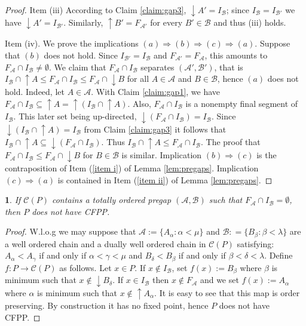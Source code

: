 \documentclass[12pt]{amsart}
\newtheorem{lemma}[definition]{\noindent {\bf Lemma}}
\begin{document}
\begin{proof}
Item (iii) According to Claim \ref{claim:gap3}, ${\downarrow \!\!}
A'=I_{\mathcal B}$; since $I_{\mathcal B}=I_{\mathcal B'}$ we have
${\downarrow \!\!} A'=I_{\mathcal B'}$. Similarly, ${\uparrow \!\!}
B'=F_{\mathcal A'}$ for every $B'\in \mathcal B$ and thus (iii) holds.

Item (iv). We prove the implications $(a) \Rightarrow (b)\Rightarrow
(c) \Rightarrow (a)$. Suppose that $(b)$ does not hold. Since
$I_{\mathcal B'}=I_{\mathcal B}$ and $F_{\mathcal A'}=F_{\mathcal A}$,
this amounts to $F_{\mathcal A}\cap I_{\mathcal B}\not =\emptyset$. We
claim that $F_{\mathcal A}\cap I_{\mathcal B}$ separates $(\mathcal
A', \mathcal B')$, that is $I_{\mathcal B}\cap {\uparrow \!\!} A\leq
F_{\mathcal A}\cap I_{\mathcal B}\leq F_{\mathcal A}\cap
{\downarrow \!\!} B$ for all $A\in \mathcal A$ and $B\in\mathcal B$,
hence $(a)$ does not hold. Indeed, let $A\in \mathcal A$.  With Claim
\ref {claim:gap1}, we have $F_{\mathcal A}\cap I_{\mathcal B}\subseteq
{\uparrow \!\!} A={\uparrow \!\!} (I_{\mathcal B}\cap {\uparrow \!\!}
A)$. Also, $F_{\mathcal A}\cap I_{\mathcal B}$ is a nonempty final
segment of $I_{\mathcal B}$. This later set being up-directed,
${\downarrow \!\!} (F_{\mathcal A}\cap I_{\mathcal B})=I_{\mathcal
B}$. Since ${\downarrow \!\!} (I_{\mathcal B}\cap {\uparrow \!\!} A)=
I_{\mathcal B}$ from Claim \ref {claim:gap3} it follows that
$I_{\mathcal B}\cap {\uparrow \!\!} A\subseteq {\downarrow \!\!}
(F_{\mathcal A}\cap I_{\mathcal B})$. Thus $I_{\mathcal B}\cap
{\uparrow \!\!} A\leq F_{\mathcal A}\cap I_{\mathcal B}$. The proof that
$F_{\mathcal A}\cap I_{\mathcal B}\leq F_{\mathcal A}\cap
{\downarrow \!\!} B$ for $B\in\mathcal B$ is similar.  Implication
$(b)\Rightarrow (c)$ is the contraposition of Item (\ref {item i}) of
Lemma \ref{lem:pregaps}. Implication $(c)\Rightarrow (a)$ is contained
in Item (\ref {item ii}) of Lemma \ref{lem:pregaps}. \end{proof}

\begin{lemma} \label {lem:fix-pointfree} 
If $\mathcal C (P)$ contains a totally ordered pregap $(\mathcal
A,\mathcal B)$ such that $F_{\mathcal A}\cap I_{\mathcal B}=\emptyset$, 
then $P$ does not have CFPP.
\end{lemma}

\begin{proof}
W.l.o.g we may suppose that $\mathcal A:=\{A_{\alpha}:\alpha<\mu\}$
and $\mathcal B: =\{B_{\beta}:\beta<\lambda\}$ are a well ordered
chain and a dually well ordered chain in $\mathcal C (P)$
satisfying: $A_{\alpha}<A_{\gamma}$ if and only if $\alpha<\gamma<\mu$
and $B_{\delta}<B_{\beta}$ if and only if
$\beta<\delta<\lambda$. Define $f: P\rightarrow \mathcal C (P)$ as
follows. Let $x\in P$. If $x\not \in I_{\mathcal B}$, set $f(x):=
B_{\beta}$ where $\beta$ is minimum such that $x\not \in
{\downarrow \!\!} B_{\delta}$. If $x\in I_{\mathcal B}$ then $x \not \in
F_{\mathcal A}$ and we set $f(x):= A_{\alpha}$ where $\alpha$ is
minimum such that $x\not \in {\uparrow \!\!} A_{\alpha}$. It is easy to
see that this map is order preserving. By construction it has no fixed
point, hence $P$ does not have CFPP.  
\end{proof}
\end{document}
